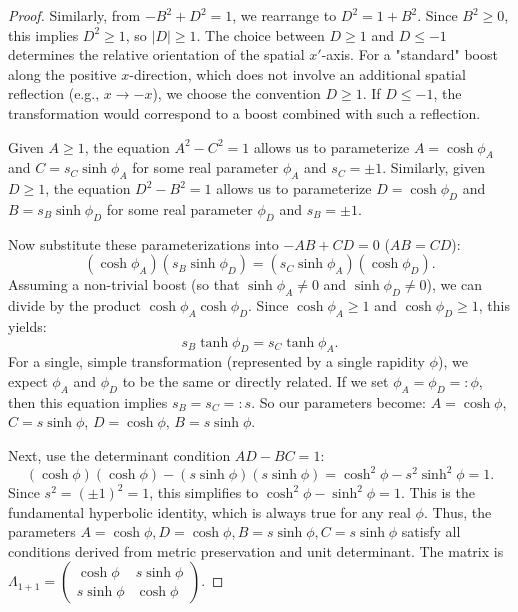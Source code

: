 \documentclass{amsart}
\theoremstyle{definition}
\theoremstyle{remark}
\begin{document}
\begin{proof}
  Similarly, from $-B^2 + D^2 = 1$, we rearrange to $D^2 = 1 + B^2$. Since $B^2 \geq 0$, this implies $D^2 \geq 1$, so $|D| \geq 1$.
  The choice between $D \geq 1$ and $D \leq -1$ determines the relative orientation of the spatial $x'$-axis. For a "standard" boost along the positive $x$-direction, which does not involve an additional spatial reflection (e.g., $x \to -x$), we choose the convention $D \geq 1$. If $D \leq -1$, the transformation would correspond to a boost combined with such a reflection.

  Given $A \geq 1$, the equation $A^2 - C^2 = 1$ allows us to parameterize $A = \cosh\phi_A$ and $C = s_C \sinh\phi_A$ for some real parameter $\phi_A$ and $s_C = \pm 1$.
  Similarly, given $D \geq 1$, the equation $D^2 - B^2 = 1$ allows us to parameterize $D = \cosh\phi_D$ and $B = s_B \sinh\phi_D$ for some real parameter $\phi_D$ and $s_B = \pm 1$.

  Now substitute these parameterizations into $-AB + CD = 0$ ($AB = CD$):
  \begin{equation*}
    (\cosh\phi_A)(s_B \sinh\phi_D) = (s_C \sinh\phi_A)(\cosh\phi_D).
  \end{equation*}
  Assuming a non-trivial boost (so that $\sinh\phi_A \neq 0$ and $\sinh\phi_D \neq 0$), we can divide by the product $\cosh\phi_A \cosh\phi_D$. Since $\cosh\phi_A \ge 1$ and $\cosh\phi_D \ge 1$, this yields:
  \begin{equation*}
    s_B \tanh\phi_D = s_C \tanh\phi_A.
  \end{equation*}
  For a single, simple transformation (represented by a single rapidity $\phi$), we expect $\phi_A$ and $\phi_D$ to be the same or directly related. If we set $\phi_A = \phi_D =: \phi$, then this equation implies $s_B = s_C =: s$.
  So our parameters become: $A = \cosh\phi$, $C = s \sinh\phi$, $D = \cosh\phi$, $B = s \sinh\phi$.

  Next, use the determinant condition $AD-BC=1$:
  \begin{equation*}
    (\cosh\phi)(\cosh\phi) - (s \sinh\phi)(s \sinh\phi) = \cosh^2\phi - s^2 \sinh^2\phi = 1.
  \end{equation*}
  Since $s^2 = (\pm 1)^2 = 1$, this simplifies to $\cosh^2\phi - \sinh^2\phi = 1$. This is the fundamental hyperbolic identity, which is always true for any real $\phi$.
  Thus, the parameters $A=\cosh\phi, D=\cosh\phi, B=s\sinh\phi, C=s\sinh\phi$ satisfy all conditions derived from metric preservation and unit determinant.
  The matrix is $\Lambda_{1+1} = \begin{pmatrix} \cosh\phi & s\sinh\phi \\ s\sinh\phi & \cosh\phi \end{pmatrix}$.


\end{proof}
\end{document}
